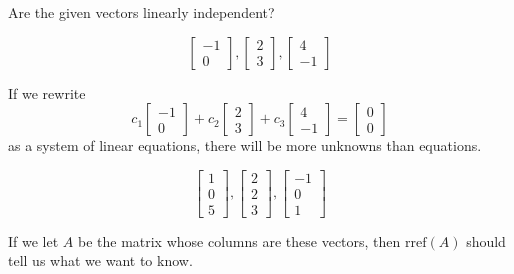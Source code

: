 \documentclass{ximera}
\begin{document}
\begin{problem} Are the given vectors linearly independent?

\begin{problem}\label{prob:linindmultchoice1}
$$\begin{bmatrix}-1\\0\end{bmatrix}, \begin{bmatrix}2\\3\end{bmatrix},\begin{bmatrix}4\\-1\end{bmatrix}$$

\begin{multipleChoice}
 \end{multipleChoice}
 \begin{hint}
 If we rewrite $$c_1\begin{bmatrix}-1\\0\end{bmatrix}+c_2 \begin{bmatrix}2\\3\end{bmatrix}+c_3\begin{bmatrix}4\\-1\end{bmatrix}=\begin{bmatrix}0\\0\end{bmatrix}$$ as a system of linear equations, there will be more unknowns than equations.
 \end{hint}
\end{problem}

\begin{problem}\label{prob:linindmultchoice2}
$$\begin{bmatrix}1\\0\\5\end{bmatrix}, \begin{bmatrix}2\\2\\3\end{bmatrix},\begin{bmatrix}-1\\0\\1\end{bmatrix}$$

\begin{multipleChoice}
 \end{multipleChoice}
\begin{hint}
If we let $A$ be the matrix whose columns are these vectors, then $\mbox{rref}(A)$ should tell us what we want to know.
\end{hint}
\end{problem}


\end{problem}
\end{document}
